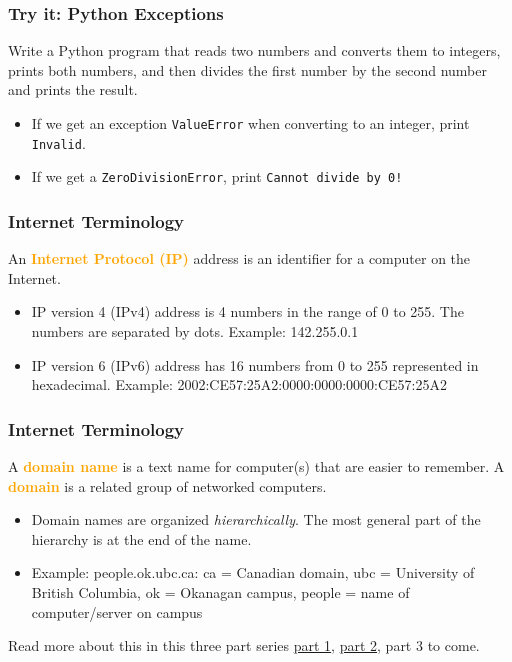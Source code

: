 \documentclass[xcolor=svgnames]{beamer}
\newcommand{\define}[1]{\textbf{\textcolor{orange}{#1}}}
\newcommand{\ft}[1]{\frametitle{#1}}
\begin{document}
\begin{frame}\ft{Try it: Python Exceptions}
\begin{example}
 Write a Python program that reads two numbers and converts them to integers, prints both numbers, and then divides the first number by the second number and prints the result. 
\begin{itemize}
\item If we get an exception {\tt ValueError} when converting to an integer, print {\tt Invalid}.
\item If we get a {\tt ZeroDivisionError}, print {\tt Cannot divide by 0!}
\end{itemize}
\end{example}
\end{frame}




\begin{frame}\ft{Internet Terminology}
An \define{Internet Protocol (IP)} address is an identifier for a computer on the Internet.
\begin{itemize}
\item IP version 4 (IPv4) address is 4 numbers in the range of 0 to 255.  The numbers are separated by dots. Example: 142.255.0.1
\item IP version 6 (IPv6) address has 16 numbers from 0 to 255 represented in hexadecimal.  Example: 2002:CE57:25A2:0000:0000:0000:CE57:25A2
\end{itemize}
\end{frame}
\begin{frame}\ft{Internet Terminology}
A \define{domain name} is a text name for computer(s) that are easier to remember.  A \define{domain} is a related group of networked computers.
\begin{itemize}
\item Domain names are organized \emph{hierarchically}.  The most general part of the hierarchy is at the end of the name. 
\item Example:  people.ok.ubc.ca:
ca = Canadian domain, ubc = University of British Columbia, ok = Okanagan campus, people = name of computer/server on campus 
\end{itemize}
\vspace{2em}
Read more about this in this three part series \href{https://www.spiria.com/en/blog/internet/understanding-the-internet-part-1-ip-addressing-and-ports/}{part 1}, \href{https://www.spiria.com/en/blog/internet/understanding-the-internet-part-2-domain-names/}{part 2}, part 3 to come.
\end{frame}
\end{document}
